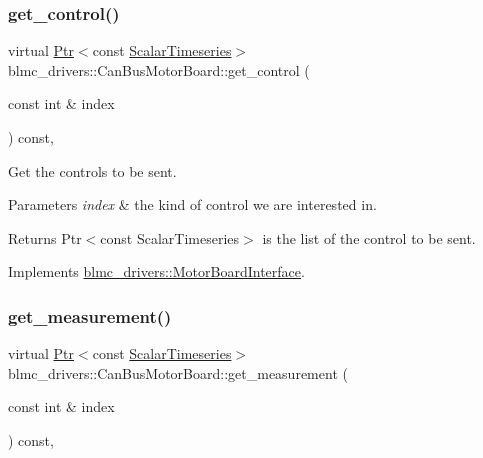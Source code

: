 \subsubsection{\texorpdfstring{get\+\_\+control()}{get\_control()}}
{\footnotesize\ttfamily virtual \hyperlink{classblmc__drivers_1_1MotorBoardInterface_a6a733b7ed7a3a96f6b0712b6bb5307f8}{Ptr}$<$const \hyperlink{classblmc__drivers_1_1MotorBoardInterface_a14e237254ba495a66091ea3a3a33fa75}{Scalar\+Timeseries}$>$ blmc\+\_\+drivers\+::\+Can\+Bus\+Motor\+Board\+::get\+\_\+control (\begin{DoxyParamCaption}\item[{const int \&}]{index }\end{DoxyParamCaption}) const\hspace{0.3cm}{\ttfamily [inline]}, {\ttfamily [virtual]}}



Get the controls to be sent. 


\begin{DoxyParams}{Parameters}
{\em index} & the kind of control we are interested in. \\
\hline
\end{DoxyParams}
\begin{DoxyReturn}{Returns}
Ptr$<$const Scalar\+Timeseries$>$ is the list of the control to be sent. 
\end{DoxyReturn}


Implements \hyperlink{classblmc__drivers_1_1MotorBoardInterface_aa5eeed12c851993f2e2c93f5479df9de}{blmc\+\_\+drivers\+::\+Motor\+Board\+Interface}.

\mbox{\label{classblmc__drivers_1_1CanBusMotorBoard_a0fac258ce65f51074bdb6c64ce8ebded}} 
\subsubsection{\texorpdfstring{get\+\_\+measurement()}{get\_measurement()}}
{\footnotesize\ttfamily virtual \hyperlink{classblmc__drivers_1_1MotorBoardInterface_a6a733b7ed7a3a96f6b0712b6bb5307f8}{Ptr}$<$const \hyperlink{classblmc__drivers_1_1MotorBoardInterface_a14e237254ba495a66091ea3a3a33fa75}{Scalar\+Timeseries}$>$ blmc\+\_\+drivers\+::\+Can\+Bus\+Motor\+Board\+::get\+\_\+measurement (\begin{DoxyParamCaption}\item[{const int \&}]{index }\end{DoxyParamCaption}) const\hspace{0.3cm}{\ttfamily [inline]}, {\ttfamily [virtual]}}



